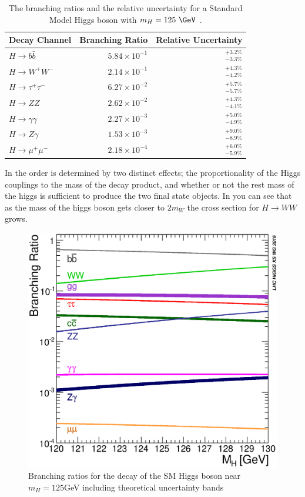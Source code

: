 \begin{table}[htpb]
 \centering
 \caption{ The branching ratios and the relative uncertainty for a Standard Model Higgs boson with $m_{H}=125~\GeV$ \cite{PDG2018:Ch11}.}
 \begin{tabular}{@{}lrr@{}} \toprule
  Decay Channel           & Branching Ratio       & Relative Uncertainty \\ \midrule
  $H\to b\bar{b}$         & $5.84 \times 10^{-1}$ & $_{-3.3\%}^{+3.2\%}$ \\
  \addlinespace[0.3em]
  $H\to W^{+}W^{-}$       & $2.14 \times 10^{-1}$ & $_{-4.2\%}^{+4.3\%}$ \\
  \addlinespace[0.3em]
  $H\to \tau^{+}\tau^{-}$ & $6.27 \times 10^{-2}$ & $_{-5.7\%}^{+5.7\%}$ \\
  \addlinespace[0.3em]
  $H\to ZZ$               & $2.62 \times 10^{-2}$ & $_{-4.1\%}^{+4.3\%}$ \\
  \addlinespace[0.3em]
  $H\to \gamma\gamma$     & $2.27 \times 10^{-3}$ & $_{-4.9\%}^{+5.0\%}$ \\
  \addlinespace[0.3em]
  $H\to Z\gamma$          & $1.53 \times 10^{-3}$ & $_{-8.9\%}^{+9.0\%}$ \\
  \addlinespace[0.3em]
  $H\to \mu^{+}\mu^{-}$   & $2.18 \times 10^{-4}$ & $_{-5.9\%}^{+6.0\%}$ \\
  \bottomrule
 \end{tabular}\label{table:higgs_branching_ratios}
\end{table} 

In  the order is determined by two distinct effects; 
the proportionality of the Higgs couplings to the mass of the decay product, and whether 
or not the rest mass of the higgs is sufficient to produce the two final state objects.  
In  you can see that as the mass of the higgs boson gets 
closer to $2m_W$ the cross section for $H \rightarrow WW$ grows.

\begin{figure}[!htbp]
  \begin{center}
    \includegraphics[width=0.5\linewidth]{figures/higgs/higgs_decay_plot.eps}
    \caption{Branching ratios for the decay of the SM Higgs boson near $m_{H} = 125$GeV including theoretical uncertainty bands \cite{PDG2018:Ch11}}
    \label{fig:higgs_decay_plot}
  \end{center}
\end{figure}


